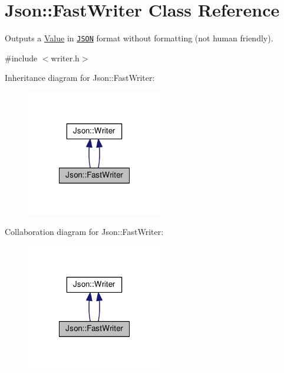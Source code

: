 \hypertarget{classJson_1_1FastWriter}{\section{Json\-:\-:Fast\-Writer Class Reference}
\label{de/d96/classJson_1_1FastWriter}
}


Outputs a \hyperlink{classJson_1_1Value}{Value} in \href{http://www.json.org}{\tt J\-S\-O\-N} format without formatting (not human friendly).  




{\ttfamily \#include $<$writer.\-h$>$}



Inheritance diagram for Json\-:\-:Fast\-Writer\-:
\nopagebreak
\begin{figure}[H]
\begin{center}
\leavevmode
\includegraphics[width=168pt]{d3/d3e/classJson_1_1FastWriter__inherit__graph}
\end{center}
\end{figure}


Collaboration diagram for Json\-:\-:Fast\-Writer\-:
\nopagebreak
\begin{figure}[H]
\begin{center}
\leavevmode
\includegraphics[width=168pt]{db/d39/classJson_1_1FastWriter__coll__graph}
\end{center}
\end{figure}
